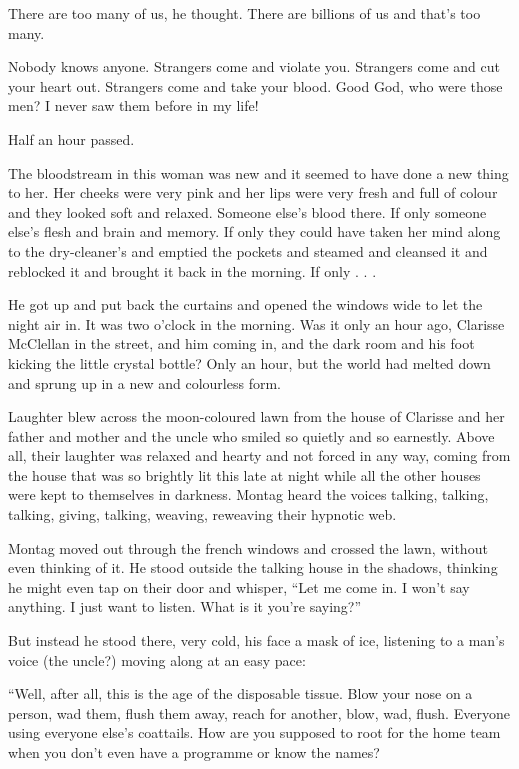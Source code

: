\documentclass[11pt,openany]{book}
\begin{document}
There are too many of us, he thought. There are billions of us and that's too many.

Nobody knows anyone. Strangers come and violate you. Strangers come and cut your heart out. Strangers come and take your blood. Good God, who were those men? I never saw them before in my life!

Half an hour passed.

The bloodstream in this woman was new and it seemed to have done a new thing to her. Her cheeks were very pink and her lips were very fresh and full of colour and they looked soft and relaxed. Someone else's blood there. If only someone else's flesh and brain and memory. If only they could have taken her mind along to the dry-cleaner's and emptied the pockets and steamed and cleansed it and reblocked it and brought it back in the morning. If only . . .

He got up and put back the curtains and opened the windows wide to let the night air in. It was two o'clock in the morning. Was it only an hour ago, Clarisse McClellan in the street, and him coming in, and the dark room and his foot kicking the little crystal bottle? Only an hour, but the world had melted down and sprung up in a new and colourless form.

Laughter blew across the moon-coloured lawn from the house of Clarisse and her father and mother and the uncle who smiled so quietly and so earnestly. Above all, their laughter was relaxed and hearty and not forced in any way, coming from the house that was so brightly lit this late at night while all the other houses were kept to themselves in darkness. Montag heard the voices talking, talking, talking, giving, talking, weaving, reweaving their hypnotic web.

Montag moved out through the french windows and crossed the lawn, without even thinking of it. He stood outside the talking house in the shadows, thinking he might even tap on their door and whisper, ``Let me come in. I won't say anything. I just want to listen. What is it you're saying?''

But instead he stood there, very cold, his face a mask of ice, listening to a man's voice (the uncle?) moving along at an easy pace:

``Well, after all, this is the age of the disposable tissue. Blow your nose on a person, wad them, flush them away, reach for another, blow, wad, flush. Everyone using everyone else's coattails. How are you supposed to root for the home team when you don't even have a programme or know the names?
\end{document}
